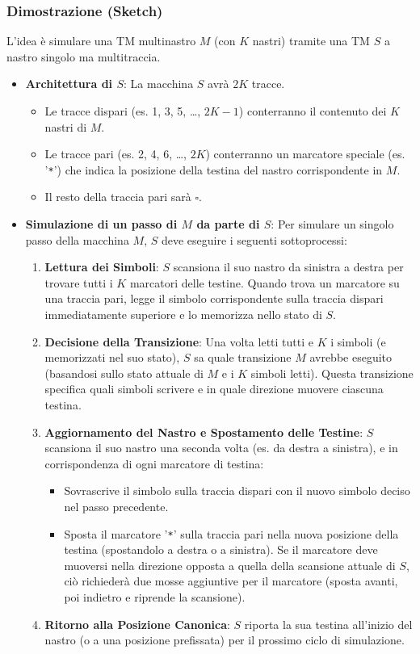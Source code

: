 \documentclass[a4paper]{article}
\theoremstyle{definition} %
\newcommand{\blankS}{\ensuremath{\square}}
\begin{document}
\subsubsection{Dimostrazione (Sketch)}
L'idea è simulare una TM multinastro $M$ (con $K$ nastri) tramite una TM $S$ a nastro singolo ma multitraccia.
\begin{itemize}
    \item \textbf{Architettura di $S$}: La macchina $S$ avrà $2K$ tracce.
        \begin{itemize}
            \item Le tracce dispari (es. 1, 3, 5, \dots, $2K-1$) conterranno il contenuto dei $K$ nastri di $M$.
            \item Le tracce pari (es. 2, 4, 6, \dots, $2K$) conterranno un marcatore speciale (es. '\texttt{*}') che indica la posizione della testina del nastro corrispondente in $M$.
            \item Il resto della traccia pari sarà $\blankS$.
        \end{itemize}
    \item \textbf{Simulazione di un passo di $M$ da parte di $S$}: Per simulare un singolo passo della macchina $M$, $S$ deve eseguire i seguenti sottoprocessi:
        \begin{enumerate}
            \item \textbf{Lettura dei Simboli}: $S$ scansiona il suo nastro da sinistra a destra per trovare tutti i $K$ marcatori delle testine. Quando trova un marcatore su una traccia pari, legge il simbolo corrispondente sulla traccia dispari immediatamente superiore e lo memorizza nello stato di $S$.
            \item \textbf{Decisione della Transizione}: Una volta letti tutti e $K$ i simboli (e memorizzati nel suo stato), $S$ sa quale transizione $M$ avrebbe eseguito (basandosi sullo stato attuale di $M$ e i $K$ simboli letti). Questa transizione specifica quali simboli scrivere e in quale direzione muovere ciascuna testina.
            \item \textbf{Aggiornamento del Nastro e Spostamento delle Testine}: $S$ scansiona il suo nastro una seconda volta (es. da destra a sinistra), e in corrispondenza di ogni marcatore di testina:
                \begin{itemize}
                    \item Sovrascrive il simbolo sulla traccia dispari con il nuovo simbolo deciso nel passo precedente.
                    \item Sposta il marcatore '\texttt{*}' sulla traccia pari nella nuova posizione della testina (spostandolo a destra o a sinistra). Se il marcatore deve muoversi nella direzione opposta a quella della scansione attuale di $S$, ciò richiederà due mosse aggiuntive per il marcatore (sposta avanti, poi indietro e riprende la scansione).
                \end{itemize}
            \item \textbf{Ritorno alla Posizione Canonica}: $S$ riporta la sua testina all'inizio del nastro (o a una posizione prefissata) per il prossimo ciclo di simulazione.
        \end{enumerate}
\end{itemize}
\end{document}
